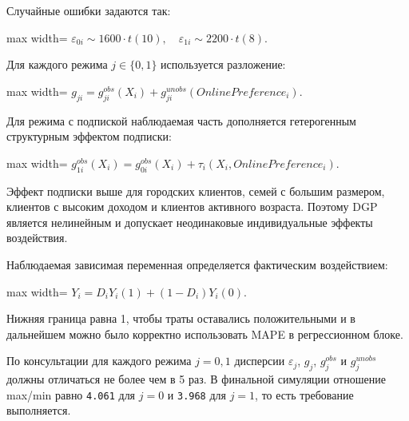 \documentclass[11pt]{article}
\begin{document}
Случайные ошибки задаются так:

\begin{center}
\begin{adjustbox}{max width=\linewidth}
\(\displaystyle \varepsilon_{0i} \sim 1600 \cdot t(10), \quad \varepsilon_{1i} \sim 2200 \cdot t(8).\)
\end{adjustbox}
\end{center}

Для каждого режима \(j \in \{0,1\}\) используется разложение:

\begin{center}
\begin{adjustbox}{max width=\linewidth}
\(\displaystyle g_{ji} = g_{ji}^{obs}(X_i) + g_{ji}^{unobs}(OnlinePreference_i).\)
\end{adjustbox}
\end{center}

Для режима с подпиской наблюдаемая часть дополняется гетерогенным
структурным эффектом подписки:

\begin{center}
\begin{adjustbox}{max width=\linewidth}
\(\displaystyle g_{1i}^{obs}(X_i) = g_{0i}^{obs}(X_i) + \tau_i(X_i, OnlinePreference_i).\)
\end{adjustbox}
\end{center}

Эффект подписки выше для городских клиентов, семей с большим размером,
клиентов с высоким доходом и клиентов активного возраста. Поэтому DGP
является нелинейным и допускает неодинаковые индивидуальные эффекты
воздействия.

Наблюдаемая зависимая переменная определяется фактическим воздействием:

\begin{center}
\begin{adjustbox}{max width=\linewidth}
\(\displaystyle Y_i = D_iY_i(1) + (1-D_i)Y_i(0).\)
\end{adjustbox}
\end{center}

Нижняя граница равна 1, чтобы траты оставались положительными и в
дальнейшем можно было корректно использовать MAPE в регрессионном блоке.

По консультации для каждого режима \(j = 0, 1\) дисперсии
\(\varepsilon_j\), \(g_j\), \(g_j^{obs}\) и \(g_j^{unobs}\) должны
отличаться не более чем в 5 раз. В финальной симуляции отношение max/min
равно \texttt{4.061} для \(j=0\) и \texttt{3.968} для \(j=1\), то есть
требование выполняется.
\end{document}
